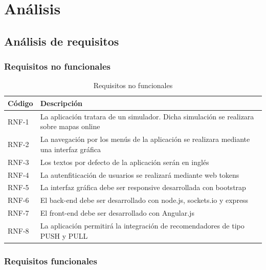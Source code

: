 \chapter{Análisis}

\section{Análisis de requisitos}

\subsection{Requisitos no funcionales}

\begin{table}[H]
	\begin{center}
		\begin{tabular}{|p{1.5cm}| p{10.5cm}|}
			\hline
			Código & Descripción \\
			\hline
			RNF-1  & La aplicación tratara de un simulador. Dicha simulación se realizara sobre mapas online\\ \hline
			RNF-2  & La navegación por los menús de la aplicación se realizara mediante una interfaz gráfica\\ \hline
			RNF-3  & Los textos por defecto de la aplicación serán en inglés\\ \hline
			RNF-4  & La autenfiticación de usuarios se realizará mediante web tokens\\ \hline
			RNF-5  & La interfaz gráfica debe ser responsive desarrollada con bootstrap\\ \hline
			RNF-6  & El back-end debe ser desarrollado con node.js, sockets.io y express \\ \hline
			RNF-7  & El front-end debe ser desarrollado con Angular.js\\ \hline
			RNF-8  & La aplicación permitirá la integración de recomendadores de tipo PUSH y PULL\\ \hline
		\end{tabular}
		\caption{Requisitos no funcionales}
		\label{tabla:requisitosNoFuncionales2}
	\end{center}
\end{table}

\newpage

\subsection{Requisitos funcionales}


